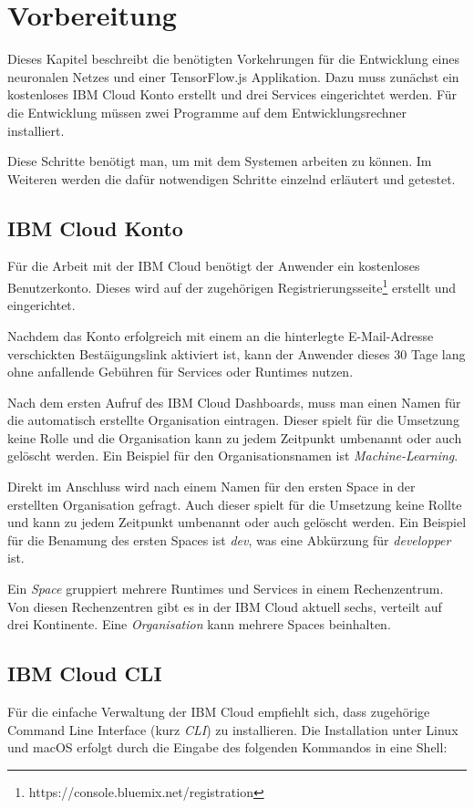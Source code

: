 \section{Vorbereitung}
Dieses Kapitel beschreibt die benötigten Vorkehrungen für die Entwicklung eines neuronalen Netzes und einer
TensorFlow.js Applikation. Dazu muss zunächst ein kostenloses IBM Cloud Konto erstellt und drei Services eingerichtet
werden. Für die Entwicklung müssen zwei Programme auf dem Entwicklungsrechner installiert.

Diese Schritte benötigt man, um mit dem Systemen arbeiten zu können. Im Weiteren werden die dafür notwendigen Schritte
einzelnd erläutert und getestet.

\subsection{IBM Cloud Konto}
Für die Arbeit mit der IBM Cloud benötigt der Anwender ein kostenloses Benutzerkonto. Dieses wird auf der zugehörigen
Registrierungsseite\footnote{https://console.bluemix.net/registration} erstellt und eingerichtet.

Nachdem das Konto erfolgreich mit einem an die hinterlegte E-Mail-Adresse verschickten Bestäigungslink aktiviert ist,
kann der Anwender dieses 30 Tage lang ohne anfallende Gebühren für Services oder Runtimes nutzen.

Nach dem ersten Aufruf des IBM Cloud Dashboards, muss man einen Namen für die automatisch erstellte Organisation
eintragen. Dieser spielt für die Umsetzung keine Rolle und die Organisation kann zu jedem Zeitpunkt umbenannt oder auch
gelöscht werden. Ein Beispiel für den Organisationsnamen ist \textit{Machine-Learning}.

Direkt im Anschluss wird nach einem Namen für den ersten Space in der erstellten Organisation gefragt. Auch dieser
spielt für die Umsetzung keine Rollte und kann zu jedem Zeitpunkt umbenannt oder auch gelöscht werden. Ein Beispiel für
die Benamung des ersten Spaces ist \textit{dev}, was eine Abkürzung für \textit{developper} ist.

Ein \textit{Space} gruppiert mehrere Runtimes und Services in einem Rechenzentrum. Von diesen Rechenzentren gibt es in
der IBM Cloud aktuell sechs, verteilt auf drei Kontinente. Eine \textit{Organisation} kann mehrere Spaces beinhalten.

\subsection{IBM Cloud CLI}
Für die einfache Verwaltung der IBM Cloud empfiehlt sich, dass zugehörige Command Line Interface (kurz \textit{CLI}) zu
installieren. Die Installation unter Linux und macOS erfolgt durch die Eingabe des folgenden Kommandos in eine Shell:

